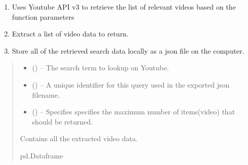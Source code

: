 \documentclass[letterpaper,10pt,english]{sphinxhowto}
\begin{document}
\begin{fulllineitems}
\label{\detokenize{_autosummary/custom_packages.preprocessing_modules.data_collector.get_youtube_video_data:custom_packages.preprocessing_modules.data_collector.get_youtube_video_data}}
\pysigstartsignatures
\pysiglinewithargsret
{}
{\sphinxparamcomma {}\sphinxparamcomma {}}
{}
\pysigstopsignatures\begin{enumerate}
%
\item {} 
\sphinxAtStartPar
Uses Youtube API v3 to retrieve the list of relevant videos based on the function parameters

\item {} 
\sphinxAtStartPar
Extract a list of video data to return.

\item {} 
\sphinxAtStartPar
Store all of the retrieved search data locally as a json file on the computer.

\end{enumerate}
\begin{quote}\begin{description}
\begin{itemize}
\item {} 
\sphinxAtStartPar
{} () – The search term to lookup on Youtube.

\item {} 
\sphinxAtStartPar
{} () – A unique identifier for this query \sphinxhyphen{} used in the exported json filename.

\item {} 
\sphinxAtStartPar
{} (\sphinxstyleliteralemphasis{\sphinxupquote{ (}}\sphinxstyleliteralemphasis{\sphinxupquote{)}}) – Specifies specifies the maximum number of items(video) that should be returned.

\end{itemize}

\sphinxAtStartPar
Contains all the extracted video data.

\sphinxAtStartPar
pd.Dataframe

\end{description}\end{quote}

\end{fulllineitems}
\end{document}
